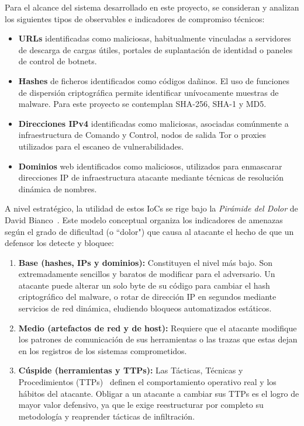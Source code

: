 \documentclass[12pt]{report}
\begin{document}
Para el alcance del sistema desarrollado en este proyecto, se consideran y analizan los siguientes tipos de observables e indicadores de compromiso técnicos:
\begin{itemize}
    \item \textbf{URLs} identificadas como maliciosas, habitualmente vinculadas a servidores de descarga de cargas útiles, portales de suplantación de identidad o paneles de control de botnets.
    \item \textbf{Hashes} de ficheros identificados como códigos dañinos. El uso de funciones de dispersión criptográfica permite identificar unívocamente muestras de malware. Para este proyecto se contemplan SHA-256, SHA-1 y MD5.
    \item \textbf{Direcciones IPv4} identificadas como maliciosas, asociadas comúnmente a infraestructura de Comando y Control, nodos de salida Tor o proxies utilizados para el escaneo de vulnerabilidades.
    \item \textbf{Dominios} web identificados como maliciosos, utilizados para enmascarar direcciones IP de infraestructura atacante mediante técnicas de resolución dinámica de nombres.
\end{itemize}

A nivel estratégico, la utilidad de estos IoCs se rige bajo la \textit{Pirámide del Dolor} de David Bianco~\cite{davidjbianco2013,castro2025}. Este modelo conceptual organiza los indicadores de amenazas según el grado de dificultad (o ``dolor") que causa al atacante el hecho de que un defensor los detecte y bloquee:
\begin{enumerate}
    \item \textbf{Base (hashes, IPs y dominios):} Constituyen el nivel más bajo. Son extremadamente sencillos y baratos de modificar para el adversario. Un atacante puede alterar un solo byte de su código para cambiar el hash criptográfico del malware, o rotar de dirección IP en segundos mediante servicios de red dinámica, eludiendo bloqueos automatizados estáticos.
    \item \textbf{Medio (artefactos de red y de host):} Requiere que el atacante modifique los patrones de comunicación de sus herramientas o las trazas que estas dejan en los registros de los sistemas comprometidos.
    \item \textbf{Cúspide (herramientas y TTPs):} Las Tácticas, Técnicas y Procedimientos (TTPs)~\cite{attck} definen el comportamiento operativo real y los hábitos del atacante. Obligar a un atacante a cambiar sus TTPs es el logro de mayor valor defensivo, ya que le exige reestructurar por completo su metodología y reaprender tácticas de infiltración.
\end{enumerate}
\end{document}
